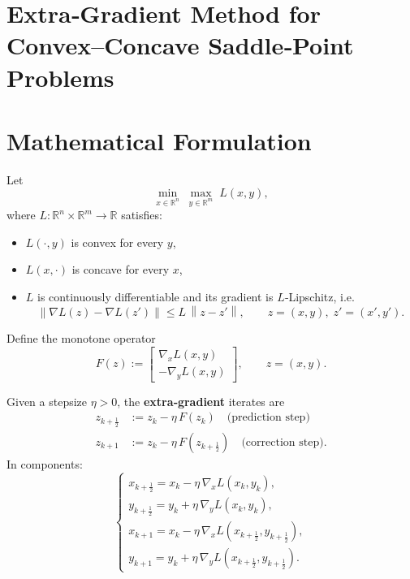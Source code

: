 \documentclass{article}
\newcommand{\R}{\mathbb{R}}
\newcommand{\norm}[1]{\left\lVert #1 \right\rVert}
\begin{document}
\section*{Extra‑Gradient Method for Convex–Concave Saddle‑Point Problems}

\section*{Mathematical Formulation}
Let 
\[
\min_{x\in\R^{n}}\;\max_{y\in\R^{m}} \;L(x,y),
\]
where $L:\R^{n}\times\R^{m}\to\R$ satisfies:

\begin{itemize}
  \item $L(\cdot ,y)$ is convex for every $y$,
  \item $L(x,\cdot )$ is concave for every $x$,
  \item $L$ is continuously differentiable and its gradient is $L$‑Lipschitz, i.e.
  \[
  \norm{\nabla L(z)-\nabla L(z')}\leq L\,\norm{z-z'},\qquad 
  z=(x,y),\;z'=(x',y').
  \]
\end{itemize}
Define the monotone operator
\[
F(z):=
\begin{bmatrix}
\nabla_{x}L(x,y)\\[2mm]
-\nabla_{y}L(x,y)
\end{bmatrix},
\qquad z=(x,y).
\]

Given a stepsize $\eta>0$, the \textbf{extra‑gradient} iterates are
\[
\begin{aligned}
z_{k+\frac12}&:=z_{k}-\eta\,F(z_{k})\quad\text{(prediction step)}\\[2mm]
z_{k+1}&:=z_{k}-\eta\,F(z_{k+\frac12})\quad\text{(correction step)} .
\end{aligned}
\]
In components:
\[
\begin{cases}
x_{k+\frac12}=x_{k}-\eta\,\nabla_{x}L(x_{k},y_{k}),\\[1mm]
y_{k+\frac12}=y_{k}+\eta\,\nabla_{y}L(x_{k},y_{k}),\\[2mm]
x_{k+1}=x_{k}-\eta\,\nabla_{x}L(x_{k+\frac12},y_{k+\frac12}),\\[1mm]
y_{k+1}=y_{k}+\eta\,\nabla_{y}L(x_{k+\frac12},y_{k+\frac12}) .
\end{cases}
\]
\end{document}

